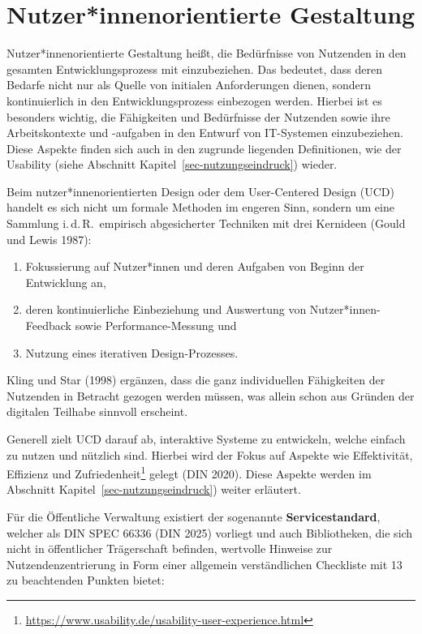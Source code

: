 \documentclass[
  11pt,
  letterpaper,
  DIV=11,
  twoside]{scrreprt}
\DeclareRobustCommand{\href}[2]{#2\footnote{\url{#1}}}
\begin{document}
\section{Nutzer*innenorientierte
Gestaltung}\label{sec-nutzerinnenorientierte-gestaltung}

Nutzer*innenorientierte Gestaltung heißt, die Bedürfnisse von Nutzenden
in den gesamten Entwicklungsprozess mit einzubeziehen. Das bedeutet,
dass deren Bedarfe nicht nur als Quelle von initialen Anforderungen
dienen, sondern kontinuierlich in den Entwicklungsprozess einbezogen
werden. Hierbei ist es besonders wichtig, die Fähigkeiten und
Bedürfnisse der Nutzenden sowie ihre Arbeitskontexte und -aufgaben in
den Entwurf von IT-Systemen einzubeziehen. Diese Aspekte finden sich
auch in den zugrunde liegenden Definitionen, wie der Usability (siehe
Abschnitt Kapitel~\ref{sec-nutzungseindruck}) wieder.

Beim nutzer*innenorientierten Design oder dem User-Centered Design (UCD)
handelt es sich nicht um formale Methoden im engeren Sinn, sondern um
eine Sammlung i.\,d.\,R.~empirisch abgesicherter Techniken mit drei
Kernideen (Gould und Lewis 1987):

\begin{enumerate}
\def\labelenumi{\arabic{enumi}.}
\item
  Fokussierung auf Nutzer*innen und deren Aufgaben von Beginn der
  Entwicklung an,
\item
  deren kontinuierliche Einbeziehung und Auswertung von
  Nutzer*innen-Feedback sowie Performance-Messung und
\item
  Nutzung eines iterativen Design-Prozesses.
\end{enumerate}

Kling und Star (1998) ergänzen, dass die ganz individuellen Fähigkeiten
der Nutzenden in Betracht gezogen werden müssen, was allein schon aus
Gründen der digitalen Teilhabe sinnvoll erscheint.

Generell zielt UCD darauf ab, interaktive Systeme zu entwickeln, welche
einfach zu nutzen und nützlich sind. Hierbei wird der Fokus auf Aspekte
wie
\href{https://www.usability.de/usability-user-experience.html}{Effektivität,
Effizienz und Zufriedenheit} gelegt (DIN 2020). Diese Aspekte werden im
Abschnitt Kapitel~\ref{sec-nutzungseindruck}) weiter erläutert.

Für die Öffentliche Verwaltung existiert der sogenannte
\textbf{Servicestandard}, welcher als DIN SPEC 66336 (DIN 2025) vorliegt
und auch Bibliotheken, die sich nicht in öffentlicher Trägerschaft
befinden, wertvolle Hinweise zur Nutzendenzentrierung in Form einer
allgemein verständlichen Checkliste mit 13 zu beachtenden Punkten
bietet:
\end{document}
